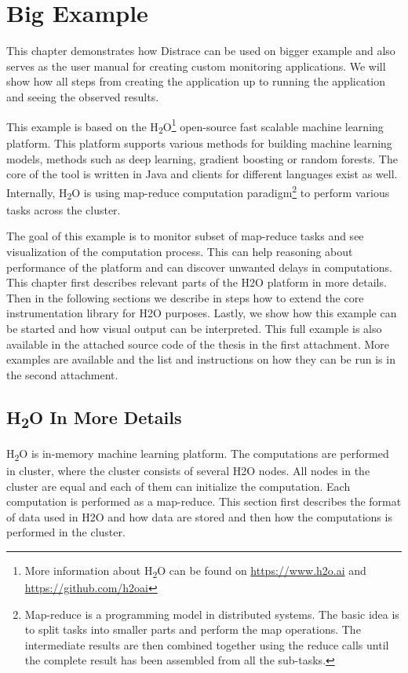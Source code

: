 \chapter{Big Example}
\label{chap:big_example}
This chapter demonstrates how Distrace can be used on bigger example and also serves as the user manual for creating custom monitoring applications. We will show how all steps from creating the application up to running the application and seeing the observed results.

This example is based on the H\textsubscript{2}O\footnote{More information about H\textsubscript{2}O can be found on \url{https://www.h2o.ai} and \url{https://github.com/h2oai}} open-source fast scalable machine learning platform. This platform supports various methods for building machine learning models, methods such as deep learning, gradient boosting or random forests. The core of the tool is written in Java and clients for different languages exist as well. Internally, H\textsubscript{2}O is using map-reduce computation paradigm\footnote{Map-reduce is a programming model in distributed systems. The basic idea is to split tasks into smaller parts and perform the map operations. The intermediate results are then combined together using the reduce calls until the complete result has been assembled from all the sub-tasks.} to perform various tasks across the cluster.

The goal of this example is to monitor subset of map-reduce tasks and see visualization of the computation process. This can help reasoning about performance of the platform and can discover unwanted delays in computations. This chapter first describes relevant parts of the H2O platform in more details. Then in the following sections we describe in steps how to extend the core instrumentation library for H2O purposes. Lastly, we show how this example can be started and how visual output can be interpreted. 
This full example is also available in the attached source code of the thesis in the first attachment. More examples are available and the list and instructions on how they can be run is in the second attachment.

\section{H\textsubscript{2}O In More Details}
H\textsubscript{2}O is in-memory machine learning platform. The computations are performed in cluster, where the cluster consists of several H2O nodes. All nodes in the cluster are equal and each of them can initialize the computation. Each computation is performed as a map-reduce. This section first describes the format of data used in H2O and how data are stored and then how the computations is performed in the cluster. 

